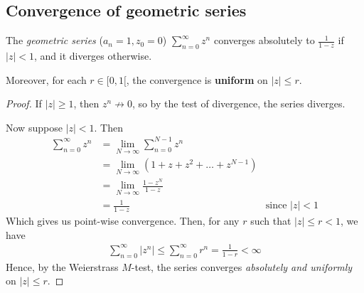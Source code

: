 \documentclass[12pt]{article}
\begin{document}
\subsection{Convergence of geometric series}

\begin{theorem}
    The \textit{geometric series} ($a_n=1, z_0=0$) $\sum_{n=0}^{\infty}z^n$ converges absolutely to $\frac{1}{1-z}$ if $|z|<1$, and it diverges otherwise. 

    Moreover, for each $r\in [0,1[$, the convergence is \textbf{uniform} on $|z|\leq r$.
\end{theorem}
\begin{proof}
    If $|z|\geq 1$, then $z^n\not\to 0$, so by the test of divergence, the series diverges.

    Now suppose $|z|<1$. Then \begin{align*}
        \sum_{n=0}^{\infty}z^n &= \lim_{N\to \infty}\sum_{n=0}^{N-1}z^n\\
        &= \lim_{N\to \infty}(1+z+z^2+\dots+z^{N-1})\\
        &= \lim_{N\to \infty}\frac{1-z^N}{1-z}\\
        &= \frac{1}{1-z} &\text{since }|z|<1
    \end{align*}
    Which gives us point-wise convergence. Then, for any $r$ such that $|z|\leq r<1$, we have \begin{align*}
        \sum_{n=0}^{\infty}|z^n|\leq \sum_{n=0}^{\infty}r^n =\frac{1}{1-r}<\infty
    \end{align*}
    Hence, by the Weierstrass $M$-test, the series converges \textit{absolutely and uniformly} on $|z|\leq r$.
\end{proof}
\end{document}
